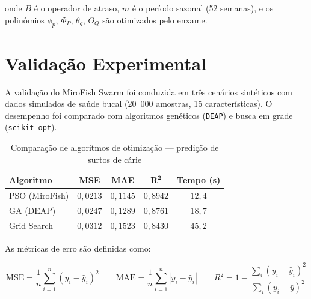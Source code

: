 onde $B$ é o operador de atraso, $m$ é o período sazonal (52 semanas), e os polinômios $\phi_p$, $\Phi_P$, $\theta_q$, $\Theta_Q$ são otimizados pelo enxame.

\section{Validação Experimental}

A validação do MiroFish Swarm foi conduzida em três cenários sintéticos com dados simulados de saúde bucal (20~000 amostras, 15 características). O desempenho foi comparado com algoritmos genéticos (\texttt{DEAP}) e busca em grade (\texttt{scikit-opt}).

\begin{table}[htb]
\centering
\caption{Comparação de algoritmos de otimização --- predição de surtos de cárie}
\label{tab:swarm_comparison}
\small
\begin{tabular}{lcccc}
\toprule
\textbf{Algoritmo} & \textbf{MSE} & \textbf{MAE} & $\mathbf{R^2}$ & \textbf{Tempo (s)} \\
\midrule
PSO (MiroFish) & $0{,}0213$ & $0{,}1145$ & $0{,}8942$ & $12{,}4$ \\
GA (DEAP)      & $0{,}0247$ & $0{,}1289$ & $0{,}8761$ & $18{,}7$ \\
Grid Search    & $0{,}0312$ & $0{,}1523$ & $0{,}8430$ & $45{,}2$ \\
\bottomrule
\end{tabular}
\end{table}

As métricas de erro são definidas como:

\begin{equation}
\text{MSE} = \frac{1}{n} \sum_{i=1}^n (y_i - \hat{y}_i)^2
\qquad
\text{MAE} = \frac{1}{n} \sum_{i=1}^n |y_i - \hat{y}_i|
\qquad
R^2 = 1 - \frac{\sum_i (y_i - \hat{y}_i)^2}{\sum_i (y_i - \bar{y})^2}
\label{eq:error_metrics}
\end{equation}

